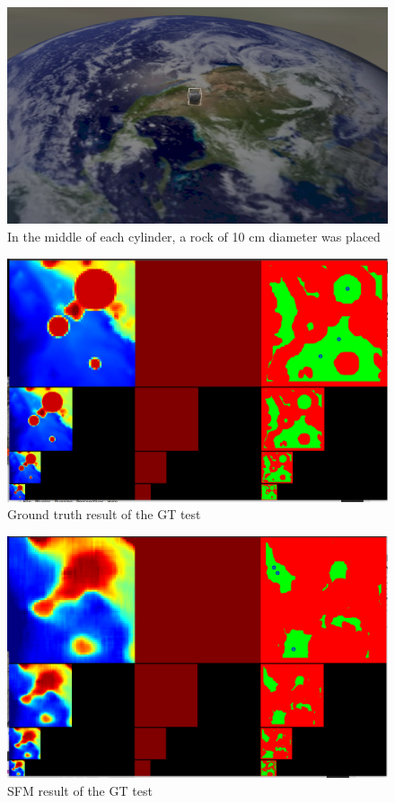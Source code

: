 \begin{figure}[ht]
\centering
\includegraphics[scale=0.18]{images/methodology/test_setup2.png}
\caption{In the middle of each cylinder, a rock of 10 cm diameter was placed}
\label{fig:gt_test_setup2}
\end{figure}

\begin{figure}[ht]
\centering
\includegraphics[scale=0.22]{images/methodology/GT.png}
\caption{Ground truth result of the GT test}
\label{fig:gt_test_gt} 
\end{figure}

\begin{figure}[ht]
\centering
\includegraphics[scale=0.22]{images/methodology/SFM.png}
\caption{SFM result of the GT test}
\label{fig:gt_test_sfm}
\end{figure} 

